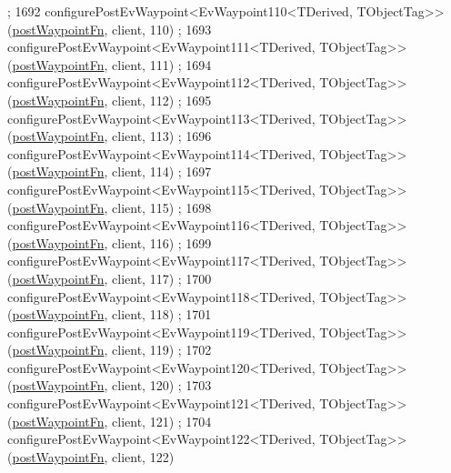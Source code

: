 \begin{DoxyCode}
      ;
1692     configurePostEvWaypoint<EvWaypoint110<TDerived, TObjectTag>>(\hyperlink{classmove__base__z__client_1_1WaypointEventDispatcher_acc538eb7506c13f7cca2268a1742dadd}{postWaypointFn}, client, 110)
      ;
1693     configurePostEvWaypoint<EvWaypoint111<TDerived, TObjectTag>>(\hyperlink{classmove__base__z__client_1_1WaypointEventDispatcher_acc538eb7506c13f7cca2268a1742dadd}{postWaypointFn}, client, 111)
      ;
1694     configurePostEvWaypoint<EvWaypoint112<TDerived, TObjectTag>>(\hyperlink{classmove__base__z__client_1_1WaypointEventDispatcher_acc538eb7506c13f7cca2268a1742dadd}{postWaypointFn}, client, 112)
      ;
1695     configurePostEvWaypoint<EvWaypoint113<TDerived, TObjectTag>>(\hyperlink{classmove__base__z__client_1_1WaypointEventDispatcher_acc538eb7506c13f7cca2268a1742dadd}{postWaypointFn}, client, 113)
      ;
1696     configurePostEvWaypoint<EvWaypoint114<TDerived, TObjectTag>>(\hyperlink{classmove__base__z__client_1_1WaypointEventDispatcher_acc538eb7506c13f7cca2268a1742dadd}{postWaypointFn}, client, 114)
      ;
1697     configurePostEvWaypoint<EvWaypoint115<TDerived, TObjectTag>>(\hyperlink{classmove__base__z__client_1_1WaypointEventDispatcher_acc538eb7506c13f7cca2268a1742dadd}{postWaypointFn}, client, 115)
      ;
1698     configurePostEvWaypoint<EvWaypoint116<TDerived, TObjectTag>>(\hyperlink{classmove__base__z__client_1_1WaypointEventDispatcher_acc538eb7506c13f7cca2268a1742dadd}{postWaypointFn}, client, 116)
      ;
1699     configurePostEvWaypoint<EvWaypoint117<TDerived, TObjectTag>>(\hyperlink{classmove__base__z__client_1_1WaypointEventDispatcher_acc538eb7506c13f7cca2268a1742dadd}{postWaypointFn}, client, 117)
      ;
1700     configurePostEvWaypoint<EvWaypoint118<TDerived, TObjectTag>>(\hyperlink{classmove__base__z__client_1_1WaypointEventDispatcher_acc538eb7506c13f7cca2268a1742dadd}{postWaypointFn}, client, 118)
      ;
1701     configurePostEvWaypoint<EvWaypoint119<TDerived, TObjectTag>>(\hyperlink{classmove__base__z__client_1_1WaypointEventDispatcher_acc538eb7506c13f7cca2268a1742dadd}{postWaypointFn}, client, 119)
      ;
1702     configurePostEvWaypoint<EvWaypoint120<TDerived, TObjectTag>>(\hyperlink{classmove__base__z__client_1_1WaypointEventDispatcher_acc538eb7506c13f7cca2268a1742dadd}{postWaypointFn}, client, 120)
      ;
1703     configurePostEvWaypoint<EvWaypoint121<TDerived, TObjectTag>>(\hyperlink{classmove__base__z__client_1_1WaypointEventDispatcher_acc538eb7506c13f7cca2268a1742dadd}{postWaypointFn}, client, 121)
      ;
1704     configurePostEvWaypoint<EvWaypoint122<TDerived, TObjectTag>>(\hyperlink{classmove__base__z__client_1_1WaypointEventDispatcher_acc538eb7506c13f7cca2268a1742dadd}{postWaypointFn}, client, 122)

\end{DoxyCode}
